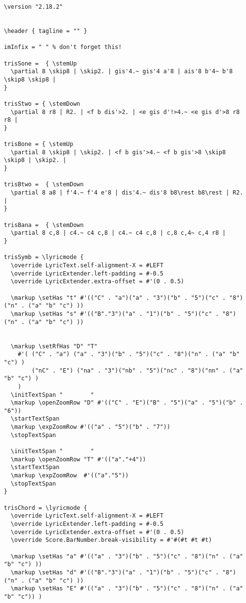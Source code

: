 \documentclass[
  DIV=calc,
  BCOR=5mm,
  12pt,
  headings=small,
  oneside,
  abstract=true,
  toc=bib,
  xcolor=dvipsnames,
  openany,
  english]{scrartcl}
\begin{document}
\begin{scriptsize}
\begin{verbatim}
\version "2.18.2"


\header { tagline = "" }

imInfix = " " % don't forget this!

trisSone =  { \stemUp
  \partial 8 \skip8 | \skip2. | gis'4.~ gis'4 a'8 | ais'8 b'4~ b'8 \skip8 \skip8 |
}

trisStwo = { \stemDown
  \partial 8 r8 | R2. | <f b dis'>2. | <e gis d'!>4.~ <e gis d'>8 r8 r8 |
}

trisBone = { \stemUp
  \partial 8 \skip8 | \skip2. | <f b gis'>4.~ <f b gis'>8 \skip8 \skip8 | \skip2. |
}

trisBtwo =  { \stemDown
  \partial 8 a8 | f'4.~ f'4 e'8 | dis'4.~ dis'8 b8\rest b8\rest | R2. |
}

trisBana =  { \stemDown
  \partial 8 c,8 | c4.~ c4 c,8 | c4.~ c4 c,8 | c,8 c,4~ c,4 r8 |
}

trisSymb = \lyricmode {
  \override LyricText.self-alignment-X = #LEFT
  \override LyricExtender.left-padding = #-0.5
  \override LyricExtender.extra-offset = #'(0 . 0.5)

  \markup \setHas "t" #'(("C" . "a")("a" . "3")("b" . "5")("c" . "8")("n" . ("a" "b" "c") ))
  \markup \setHas "s" #'(("B"."3")("a" . "1")("b" . "5")("c" . "8")("n" . ("a" "b" "c") ))


  \markup \setRfHas "D" "T"
    #'( ("C" . "a") ("a" . "3")("b" . "5")("c" . "8")("n" . ("a" "b" "c") )
        ("nC" . "E") ("na" . "3")("nb" . "5")("nc" . "8")("nn" . ("a" "b" "c") )
    )
  \initTextSpan "        "
  \markup \openZoomRow "D" #'(("C" . "E")("B" . "5")("a" . "5")("b" . "6"))
  \startTextSpan
  \markup \expZoomRow #'(("a" . "5")("b" . "7"))
  \stopTextSpan

  \initTextSpan "        "
  \markup \openZoomRow "T" #'(("a"."+4"))
  \startTextSpan
  \markup \expZoomRow  #'(("a"."5"))
  \stopTextSpan
}

trisChord = \lyricmode {
  \override LyricText.self-alignment-X = #LEFT
  \override LyricExtender.left-padding = #-0.5
  \override LyricExtender.extra-offset = #'(0 . 0.5)
  \override Score.BarNumber.break-visibility = #'#(#t #t #t)

  \markup \setHas "a" #'(("a" . "3")("b" . "5")("c" . "8")("n" . ("a" "b" "c") ))
  \markup \setHas "d" #'(("B"."3")("a" . "1")("b" . "5")("c" . "8")("n" . ("a" "b" "c") ))
  \markup \setHas "E" #'(("a" . "3")("b" . "5")("c" . "8")("n" . ("a" "b" "c")) )


\end{verbatim}
\end{scriptsize}
\end{document}
